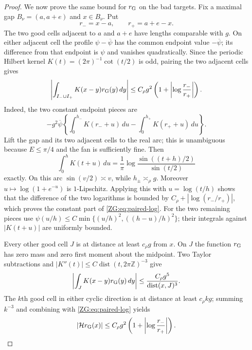 \begin{proof}
We now prove the same bound for $r_{\rm G}$ on the bad targets.  Fix a
maximal gap $B_\nu=(a,a+e)$ and $x\in B_\nu$.  Put
\[
 r_-=x-a,\qquad r_+=a+e-x.
\]
The two good cells adjacent to $a$ and $a+e$ have lengths comparable
with $g$.  On either adjacent cell the profile
$\psi-\overline\psi$ has the common endpoint value
$-\overline\psi$; its difference from that endpoint is $\psi$ and
vanishes quadratically.  Since the periodic Hilbert kernel
$K(t)=(2\pi)^{-1}\cot(t/2)$ is odd, pairing the two adjacent cells gives
\begin{equation}\label{ZG:eq:paired-log}
 \left|\int_{I_- \cup I_+}K(x-y)r_{\rm G}(y)\,dy\right|
 \le C_\rho g^2
 \left(1+\left|\log\frac{r_-}{r_+}\right|\right).
\end{equation}
Indeed, the two constant endpoint pieces are
\[
 -g^2\overline\psi
 \left\{\int_0^{h_-}K(r_-+u)\,du
       -\int_0^{h_+}K(r_++u)\,du\right\}.
\]
Lift the gap and its two adjacent cells to the real arc; this is
unambiguous because $E\le\pi/4$ and the fan is sufficiently fine.  Then
\[
 \int_0^hK(t+u)\,du
 =\frac1\pi\log\frac{\sin((t+h)/2)}{\sin(t/2)}
\]
exactly.  On this arc $\sin(v/2)\asymp v$, while
$h_\pm\asymp_\rho g$.  Moreover
$u\mapsto\log(1+e^{-u})$ is $1$-Lipschitz.  Applying this with
$u=\log(t/h)$ shows that the difference of the two logarithms is bounded
by $C_\rho+|\log(r_-/r_+)|$, which proves the constant part of
\eqref{ZG:eq:paired-log}.  For the two remaining pieces use
$\psi(u/h)\le C\min\{(u/h)^2,((h-u)/h)^2\}$; their integrals against
$|K(t+u)|$ are uniformly bounded.

Every other good cell $J$ is at distance at least $c_\rho g$ from $x$.
On $J$ the function $r_{\rm G}$ has zero mass and zero first moment
about the midpoint.  Two Taylor subtractions and
$|K''(t)|\le C\operatorname {dist}(t,2\pi\mathbb Z)^{-3}$ give
\[
 \left|\int_JK(x-y)r_{\rm G}(y)\,dy\right|
 \le \frac{C_\rho g^5}{\operatorname {dist}(x,J)^3}.
\]
The $k$th good cell in either cyclic direction is at distance at least
$c_\rho kg$; summing $k^{-3}$ and combining with
\eqref{ZG:eq:paired-log} yields
\begin{equation}\label{ZG:eq:gap-pointwise}
 |\mathcal H r_{\rm G}(x)|
 \le C_\rho g^2
 \left(1+\left|\log\frac{r_-}{r_+}\right|\right).
\end{equation}


\end{proof}
